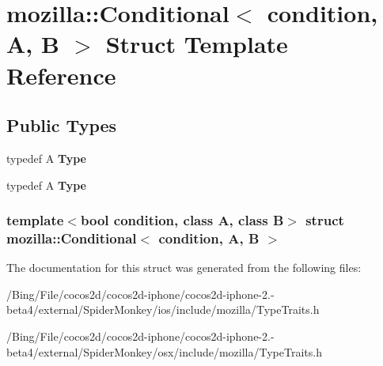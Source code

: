 \hypertarget{structmozilla_1_1_conditional}{\section{mozilla\-:\-:Conditional$<$ condition, A, B $>$ Struct Template Reference}
\label{structmozilla_1_1_conditional}
}
\subsection*{Public Types}
\begin{DoxyCompactItemize}
\item 
\hypertarget{structmozilla_1_1_conditional_a2e30cfae22835c1a00fe72fa41cefd4b}{typedef A {\bfseries Type}}\label{structmozilla_1_1_conditional_a2e30cfae22835c1a00fe72fa41cefd4b}

\item 
\hypertarget{structmozilla_1_1_conditional_a2e30cfae22835c1a00fe72fa41cefd4b}{typedef A {\bfseries Type}}\label{structmozilla_1_1_conditional_a2e30cfae22835c1a00fe72fa41cefd4b}

\end{DoxyCompactItemize}
\subsubsection*{template$<$bool condition, class A, class B$>$ struct mozilla\-::\-Conditional$<$ condition, A, B $>$}



The documentation for this struct was generated from the following files\-:\begin{DoxyCompactItemize}
\item 
/\-Bing/\-File/cocos2d/cocos2d-\/iphone/cocos2d-\/iphone-\/2.-\/beta4/external/\-Spider\-Monkey/ios/include/mozilla/Type\-Traits.\-h\item 
/\-Bing/\-File/cocos2d/cocos2d-\/iphone/cocos2d-\/iphone-\/2.-\/beta4/external/\-Spider\-Monkey/osx/include/mozilla/Type\-Traits.\-h\end{DoxyCompactItemize}
